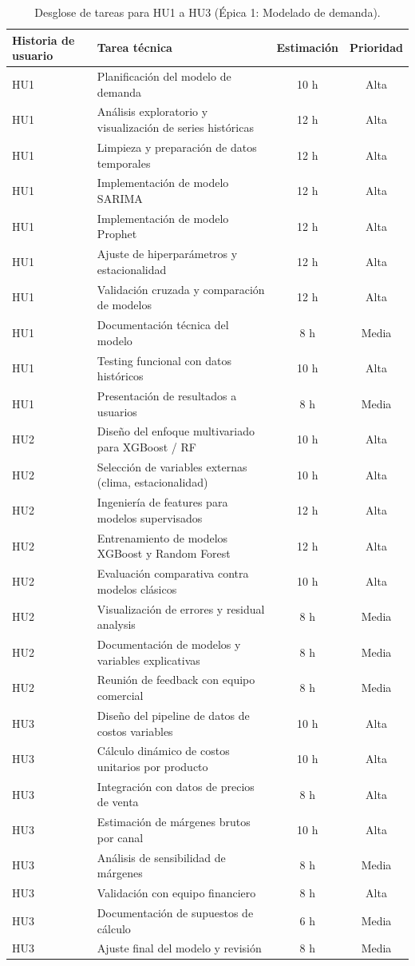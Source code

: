 \documentclass[
11pt, %
]{charter}
\begin{document}
\begin{table}[H]
\centering
\begin{tabular}{|l|p{6cm}|c|c|}
\hline
\textbf{Historia de usuario} & \textbf{Tarea técnica} & \textbf{Estimación} & \textbf{Prioridad} \\
\hline
HU1 & Planificación del modelo de demanda & 10 h & Alta \\
HU1 & Análisis exploratorio y visualización de series históricas & 12 h & Alta \\
HU1 & Limpieza y preparación de datos temporales & 12 h & Alta \\
HU1 & Implementación de modelo SARIMA & 12 h & Alta \\
HU1 & Implementación de modelo Prophet & 12 h & Alta \\
HU1 & Ajuste de hiperparámetros y estacionalidad & 12 h & Alta \\
HU1 & Validación cruzada y comparación de modelos & 12 h & Alta \\
HU1 & Documentación técnica del modelo & 8 h & Media \\
HU1 & Testing funcional con datos históricos & 10 h & Alta \\
HU1 & Presentación de resultados a usuarios & 8 h & Media \\
\hline
HU2 & Diseño del enfoque multivariado para XGBoost / RF & 10 h & Alta \\
HU2 & Selección de variables externas (clima, estacionalidad) & 10 h & Alta \\
HU2 & Ingeniería de features para modelos supervisados & 12 h & Alta \\
HU2 & Entrenamiento de modelos XGBoost y Random Forest & 12 h & Alta \\
HU2 & Evaluación comparativa contra modelos clásicos & 10 h & Alta \\
HU2 & Visualización de errores y residual analysis & 8 h & Media \\
HU2 & Documentación de modelos y variables explicativas & 8 h & Media \\
HU2 & Reunión de feedback con equipo comercial & 8 h & Media \\
\hline
HU3 & Diseño del pipeline de datos de costos variables & 10 h & Alta \\
HU3 & Cálculo dinámico de costos unitarios por producto & 10 h & Alta \\
HU3 & Integración con datos de precios de venta & 8 h & Alta \\
HU3 & Estimación de márgenes brutos por canal & 10 h & Alta \\
HU3 & Análisis de sensibilidad de márgenes & 8 h & Media \\
HU3 & Validación con equipo financiero & 8 h & Alta \\
HU3 & Documentación de supuestos de cálculo & 6 h & Media \\
HU3 & Ajuste final del modelo y revisión & 8 h & Media \\
\hline
\end{tabular}
\caption{Desglose de tareas para HU1 a HU3 (Épica 1: Modelado de demanda).}
\end{table}
\end{document}
